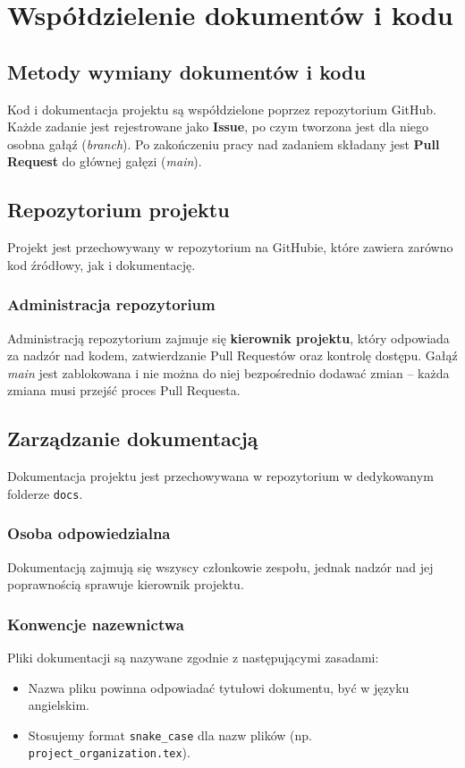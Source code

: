 \documentclass[12pt,a4paper,colorlinks=true,linkcolor=NavyBlue,citecolor=red,urlcolor=NavyBlue]{book}
\begin{document}
\chapter{Współdzielenie dokumentów i kodu}
\section{Metody wymiany dokumentów i kodu}
Kod i dokumentacja projektu są współdzielone poprzez repozytorium GitHub. Każde zadanie jest rejestrowane jako \textbf{Issue}, po czym tworzona jest dla niego osobna gałąź (\textit{branch}). Po zakończeniu pracy nad zadaniem składany jest \textbf{Pull Request} do głównej gałęzi (\textit{main}).  
\section{Repozytorium projektu}
Projekt jest przechowywany w repozytorium na GitHubie, które zawiera zarówno kod źródłowy, jak i dokumentację.  

\subsection{Administracja repozytorium}
Administracją repozytorium zajmuje się \textbf{kierownik projektu}, który odpowiada za nadzór nad kodem, zatwierdzanie Pull Requestów oraz kontrolę dostępu. Gałąź \textit{main} jest zablokowana i nie można do niej bezpośrednio dodawać zmian – każda zmiana musi przejść proces Pull Requesta.  

\section{Zarządzanie dokumentacją}
Dokumentacja projektu jest przechowywana w repozytorium w dedykowanym folderze \texttt{docs}.  

\subsection{Osoba odpowiedzialna}
Dokumentacją zajmują się wszyscy członkowie zespołu, jednak nadzór nad jej poprawnością sprawuje kierownik projektu.  

\subsection{Konwencje nazewnictwa}  
Pliki dokumentacji są nazywane zgodnie z następującymi zasadami:  
\begin{itemize}  
    \item Nazwa pliku powinna odpowiadać tytułowi dokumentu, być w języku angielskim.  
    \item Stosujemy format \texttt{snake\_case} dla nazw plików 
    (np. \texttt{project\_organization.tex}).  
\end{itemize}  
\end{document}
